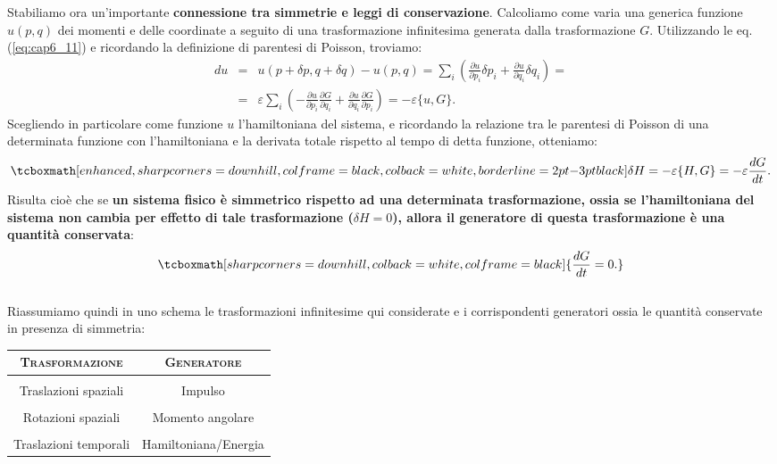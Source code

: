 \documentclass[a4paper,12pt,oneside]{book}
\begin{document}
Stabiliamo ora un'importante \textbf{connessione tra simmetrie e leggi di conservazione}. Calcoliamo come varia una generica funzione $u(p,q)$ dei momenti e delle coordinate a seguito di una trasformazione infinitesima generata dalla trasformazione $G$. Utilizzando le eq. (\ref{eq:cap6_11}) e ricordando la definizione di parentesi di Poisson, troviamo:
	\begin{eqnarray}
		du & = & u(p+\delta p , q+\delta q )- u (p,q) = \sum _i \left( \frac{\partial u}{\partial p_i} \delta p_i + \frac{\partial u}{\partial q_i } \delta q_i \right) = \nonumber \\
		&=& \varepsilon \sum _i \left( -\frac{\partial u}{\partial p_i} \frac{\partial G}{\partial q_i} + \frac{\partial u}{\partial q_i } \frac{\partial G}{\partial p_i} \right) =-\varepsilon \{ u, G \} .
	\end{eqnarray}
Scegliendo in particolare come funzione $u$ l'hamiltoniana del sistema,  e ricordando la relazione tra le parentesi di Poisson di una determinata funzione con l'hamiltoniana e la derivata totale rispetto al tempo di detta funzione, otteniamo:
	\begin{equation}
		\tcboxmath[enhanced, sharp corners=downhill, colframe=black, colback=white, borderline={2pt}{-3pt}{black}]{
			\delta H = -\varepsilon \{H,G\} = -\varepsilon \frac{dG}{dt}.
			}
	\end{equation}
Risulta cioè che se \textbf{un sistema fisico è simmetrico rispetto ad una determinata trasformazione, ossia se l'hamiltoniana del sistema non cambia per effetto di tale trasformazione ($\delta H =0$), allora il generatore di questa trasformazione è una quantità conservata}:
	\begin{equation}
		\tcboxmath[sharp corners=downhill, colback=white, colframe=black]{
			\frac{dG}{dt}=0.
			}
	\end{equation}\\
	
Riassumiamo quindi in uno schema le trasformazioni infinitesime qui considerate e i corrispondenti generatori ossia le quantità conservate in presenza di simmetria:

\begin{table}[!htbp]
\begin{center}
\begin{tabular}{c|c}
\textbf{\textsc{Trasformazione}} & \textbf{\textsc{Generatore}}\\
\hline \\
Traslazioni spaziali & Impulso \\
\hline \\
Rotazioni spaziali & Momento angolare \\
\hline \\
Traslazioni temporali &  Hamiltoniana/Energia \\
\hline 
\end{tabular}
\end{center}
\end{table}
\end{document}
